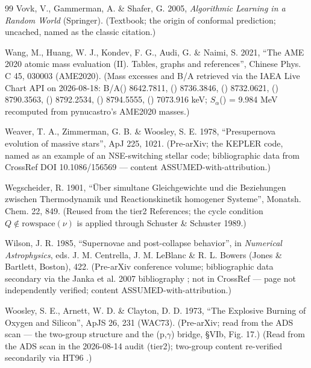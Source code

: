 \begin{thebibliography}{99}
Vovk, V., Gammerman, A. \& Shafer, G. 2005, \emph{Algorithmic Learning in a Random World} (Springer). (Textbook; the origin of conformal prediction; uncached, named as the classic citation.)

Wang, M., Huang, W. J., Kondev, F. G., Audi, G. \& Naimi, S. 2021, ``The AME 2020 atomic mass evaluation (II). Tables, graphs and references'', Chinese Phys. C 45, 030003 (AME2020). (Mass excesses and B/A retrieved via the IAEA Live Chart API  on 2026-08-18: B/A() 8642.7811, () 8736.3846, () 8732.0621, () 8790.3563, () 8792.2534, () 8794.5555, () 7073.916 keV; $S_\alpha$() = 9.984 MeV recomputed from pynucastro's AME2020 masses.)

Weaver, T. A., Zimmerman, G. B. \& Woosley, S. E. 1978, ``Presupernova evolution of massive stars'', ApJ 225, 1021. (Pre-arXiv; the KEPLER code, named as an example of an NSE-switching stellar code; bibliographic data from CrossRef DOI 10.1086/156569 --- content ASSUMED-with-attribution.)

Wegscheider, R. 1901, ``\"Uber simultane Gleichgewichte und die Beziehungen zwischen Thermodynamik und Reactionskinetik homogener Systeme'', Monatsh. Chem. 22, 849. (Reused from the tier2 References; the cycle condition $Q \notin \mathrm{rowspace}(\nu)$ is applied through Schuster \& Schuster 1989.)

Wilson, J. R. 1985, ``Supernovae and post-collapse behavior'', in \emph{Numerical Astrophysics}, eds. J. M. Centrella, J. M. LeBlanc \& R. L. Bowers (Jones \& Bartlett, Boston), 422. (Pre-arXiv conference volume; bibliographic data secondary via the Janka et al. 2007 bibliography ; not in CrossRef --- page not independently verified; content ASSUMED-with-attribution.)

Woosley, S. E., Arnett, W. D. \& Clayton, D. D. 1973, ``The Explosive Burning of Oxygen and Silicon'', ApJS 26, 231 (WAC73). (Pre-arXiv; read from the ADS scan --- the two-group structure and the (p,$\gamma$) bridge, \S VIb, Fig. 17.) (Read from the ADS scan in the 2026-08-14 audit (tier2); two-group content re-verified secondarily via HT96 .)


\end{thebibliography}
